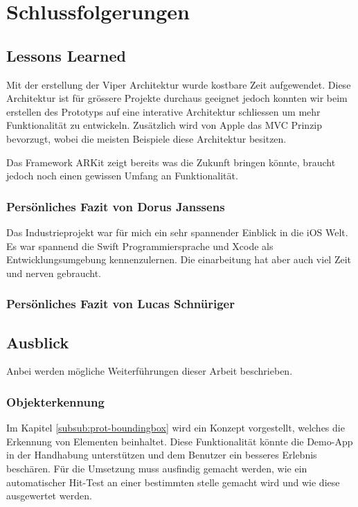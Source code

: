 \section{Schlussfolgerungen}

\subsection{Lessons Learned}
Mit der erstellung der Viper Architektur wurde kostbare Zeit aufgewendet. Diese Architektur ist für grössere Projekte durchaus geeignet jedoch konnten wir beim erstellen des Prototyps auf eine interative Architektur schliessen um mehr Funktionalität zu entwickeln. Zusätzlich wird von Apple das MVC Prinzip bevorzugt, wobei die meisten Beispiele diese Architektur besitzen.

Das Framework ARKit zeigt bereits was die Zukunft bringen könnte, braucht jedoch noch einen gewissen Umfang an Funktionalität.

\subsubsection{Persönliches Fazit von Dorus Janssens}
Das Industrieprojekt war für mich ein sehr spannender Einblick in die iOS Welt. Es war spannend die Swift Programmiersprache und Xcode als Entwicklungsumgebung kennenzulernen. Die einarbeitung hat aber auch viel Zeit und nerven gebraucht. 

\subsubsection{Persönliches Fazit von Lucas Schnüriger}


\subsection{Ausblick}

Anbei werden mögliche Weiterführungen dieser Arbeit beschrieben.

\subsubsection{Objekterkennung}
Im Kapitel \ref{subsub:prot-boundingbox} wird ein Konzept vorgestellt, welches die Erkennung von Elementen beinhaltet. Diese Funktionalität könnte die Demo-App in der Handhabung unterstützen und dem Benutzer ein besseres Erlebnis beschären. Für die Umsetzung muss ausfindig gemacht werden, wie ein automatischer Hit-Test an einer bestimmten stelle gemacht wird und wie diese ausgewertet werden.

